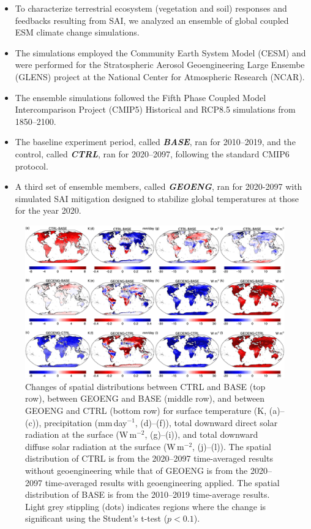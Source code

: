 
\begin{itemize}
	\item To characterize terrestrial ecosystem (vegetation and soil) responses and feedbacks resulting from SAI, we analyzed an ensemble of global coupled ESM climate change simulations.
	\item The simulations employed the Community Earth System Model (CESM) and were performed for the Stratospheric Aerosol Geoengineering Large Ensembe (GLENS) project at the National Center for Atmospheric Research (NCAR).
	\item The ensemble simulations followed the Fifth Phase Coupled Model Intercomparison Project (CMIP5) Historical and RCP8.5 simulations from 1850--2100.
	\item The baseline experiment period, called \textbf{\textit{BASE}}, ran for 2010--2019, and the control, called \textbf{\textit{CTRL}}, ran for 2020--2097, following the standard CMIP6 protocol.
	\item A third set of ensemble members, called \textbf{\textit{GEOENG}}, ran for 2020-2097 with simulated SAI mitigation designed to stabilize global temperatures at those for the year 2020.

\end{itemize}


\begin{figure}
	\begin{center}
		\includegraphics[width=\columnwidth]{erl_figures/Fig2.jpg}
	\end{center}
	\caption{Changes of spatial distributions between CTRL and BASE (top row), between GEOENG and BASE (middle row), and between GEOENG and CTRL (bottom row) for surface temperature (K, (a)--(c)), precipitation (mm\,day$^{-1}$, (d)--(f)), total downward direct solar radiation at the surface (W\,m$^{-2}$, (g)--(i)), and total downward diffuse solar radiation at the surface (W\,m$^{-2}$, (j)--(l)). The spatial distribution of CTRL is from the 2020--2097 time-averaged results without geoengineering while that of GEOENG is from the 2020--2097 time-averaged results with geoengineering applied. The spatial distribution of BASE is from the 2010--2019 time-average results. Light grey stippling (dots) indicates regions where the change is significant using the Student's t-test ($p < 0.1$).
	}\label{fig:geoeng_climate}
\end{figure}

